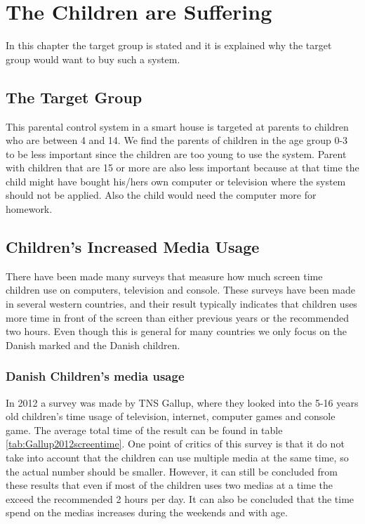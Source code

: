 \chapter{The Children are Suffering}
In this chapter the target group is stated and it is explained why the target group would want to buy such a system.
 
\section{The Target Group}
This parental control system in a smart house is targeted at parents to children who are between 4 and 14.
We find the parents of children in the age group 0-3 to be less important since the children are too young to use the system.
Parent with children that are 15 or more are also less important because at that time the child might have bought his/hers own 
computer or television where the system should not be applied. Also the child would need the computer more for homework.  
    

\section{Children's Increased Media Usage}

There have been made many surveys that measure how much screen time children use on computers, television and console. These surveys 
have been made in several western countries, and their result typically indicates that children uses more 
time in front of the screen than either previous years or the recommended two hours. 
Even though this is general for many countries we only focus on the Danish marked and the Danish children.



\subsection{Danish Children's media usage}
In 2012 a survey was made by TNS Gallup, where they looked into the 5-16 years old children's time usage of television, internet, computer games 
and console game. The average total time of the result can be found in table \ref{tab:Gallup2012screentime}. One point of critics of 
this survey is that it do not take into account that the children can use multiple media at the same time, so the actual number 
should be smaller. However, it can still be concluded from these results that even if most of the children uses two medias at a time
the exceed the recommended 2 hours per day. It can also be concluded that the time spend on the medias increases during the weekends and 
with age.

